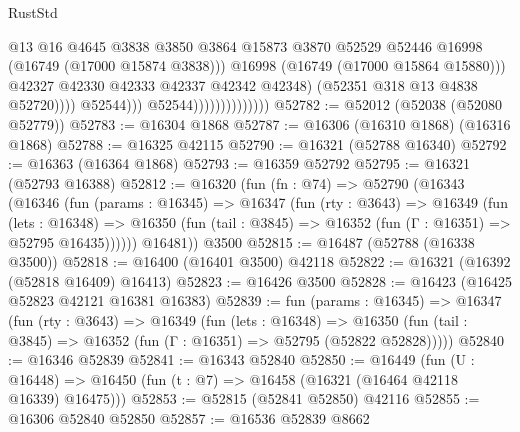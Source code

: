 \begin{lexlean}{RustStd}
\begin{coremodule}
                                                  @13
                                                  @16
                                                  @4645
                                                  @3838
                                                  @3850
                                                  @3864
                                                  @15873
                                                  @3870
                                                  @52529
                                                  @52446
                                                  @16998
                                                  (@16749 (@17000 @15874 @3838)))
                                                @16998
                                                (@16749 (@17000 @15864 @15880)))
                                              @42327
                                              @42330
                                              @42333
                                              @42337
                                              @42342
                                              @42348)
                                            (@52351 @318 @13 @4838 @52720))))
                                      @52544)))
                                @52544))))))))))))))
@52782 := @52012 (@52038 (@52080 @52779))
@52783 := @16304 @1868
@52787 := @16306 (@16310 @1868) (@16316 @1868)
@52788 := @16325 @42115
@52790 := @16321 (@52788 @16340)
@52792 := @16363 (@16364 @1868)
@52793 := @16359 @52792
@52795 := @16321 (@52793 @16388)
@52812 := @16320
    (fun (fn : @74) =>
    @52790
      (@16343
        (@16346
          (fun (params : @16345) =>
          @16347
            (fun (rty : @3643) =>
            @16349
              (fun (lets : @16348) =>
              @16350 (fun (tail : @3845) => @16352 (fun (Γ : @16351) => @52795 @16435))))))
        @16481))
    @3500
@52815 := @16487 (@52788 (@16338 @3500))
@52818 := @16400 (@16401 @3500) @42118
@52822 := @16321 (@16392 (@52818 @16409) @16413)
@52823 := @16426 @3500
@52828 := @16423 (@16425 @52823 @42121 @16381 @16383)
@52839 := fun (params : @16345) =>
  @16347
    (fun (rty : @3643) =>
    @16349
      (fun (lets : @16348) =>
      @16350 (fun (tail : @3845) => @16352 (fun (Γ : @16351) => @52795 (@52822 @52828)))))
@52840 := @16346 @52839
@52841 := @16343 @52840
@52850 := @16449
    (fun (U : @16448) => @16450 (fun (t : @7) => @16458 (@16321 (@16464 @42118 @16339) @16475)))
@52853 := @52815 (@52841 @52850) @42116
@52855 := @16306 @52840 @52850
@52857 := @16536 @52839 @8662

\end{coremodule}
\end{lexlean}
